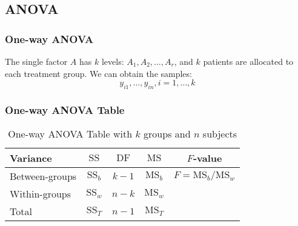 \documentclass[table,10pt]{beamer}\usepackage[]{graphicx}\usepackage[]{color}
\begin{document}
\begin{CJK*}{UTF8}{gbsn}
\subsection{ANOVA}

\begin{frame}[t]
\frametitle{One-way ANOVA}
The single factor $A$ has $k$ levels: $A_1, A_2, \dots, A_r$, and $k$ patients are allocated to 
each treatment group. We can obtain the samples:
$$
y_{i1}, \dots, y_{in}, i=1, \dots, k
$$
\end{frame}


\begin{frame}[t]
\frametitle{One-way ANOVA Table}
\begin{table}
\caption{One-way ANOVA Table with $k$ groups and $n$ subjects}
\begin{tabular}{lcccc}
\hline
Variance & $\textrm{SS}$ & $\textrm{DF}$ & $\textrm{MS}$ & $F$-value\\
\hline
Between-groups & $\textrm{SS}_b$ & $k-1$ & $\textrm{MS}_b$ & $F = \textrm{MS}_b/\textrm{MS}_w$\\
Within-groups & $\textrm{SS}_w$ & $n-k$ & $\textrm{MS}_w$ & \\
Total & $\textrm{SS}_T$ & $n-1$ & $\textrm{MS}_T$ & \\
\hline
\end{tabular}
\end{table}
\end{frame}


\end{CJK*}
\end{document}

